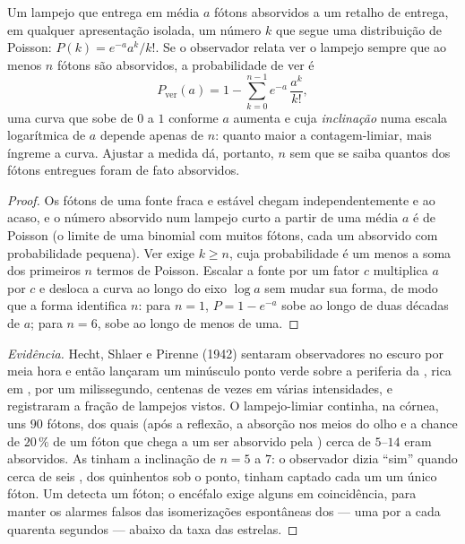 \begin{theorem}\label{thm:b3:sensory-systems:hecht}
Um lampejo que entrega em média $a$ fótons absorvidos a um retalho de
 entrega, em qualquer apresentação isolada, um número $k$ que
segue uma distribuição de Poisson: $P(k) = e^{-a}a^{k}/k!$. Se o
observador relata ver o lampejo sempre que ao menos $n$ fótons são
absorvidos, a probabilidade de ver é
\[
P_{\text{ver}}(a) = 1 - \sum_{k=0}^{n-1} e^{-a}\,\frac{a^{k}}{k!} ,
\]
uma curva que sobe de $0$ a $1$ conforme $a$ aumenta e cuja
\emph{inclinação} numa escala logarítmica de $a$ depende apenas de $n$:
quanto maior a contagem-limiar, mais íngreme a curva. Ajustar a  medida dá, portanto, $n$ sem que se saiba
quantos dos fótons entregues foram de fato absorvidos.
\end{theorem}
\begin{proof}
Os fótons de uma fonte fraca e estável chegam independentemente e ao
acaso, e o número absorvido num lampejo curto a partir de uma média $a$
é de Poisson (o limite de uma binomial com muitos fótons, cada um
absorvido com probabilidade pequena). Ver exige $k \ge n$, cuja
probabilidade é um menos a soma dos primeiros $n$ termos de Poisson.
Escalar a fonte por um fator $c$ multiplica $a$ por $c$ e desloca a
curva ao longo do eixo $\log a$ sem mudar sua forma, de modo que a forma
identifica $n$: para $n =
1$, $P = 1 - e^{-a}$ sobe ao longo de duas
décadas de $a$; para $n = 6$, sobe ao longo de menos de uma.
\end{proof}

\begin{proof}[Evidência]
Hecht, Shlaer e Pirenne (1942) sentaram observadores no escuro por meia
hora e então lançaram um minúsculo ponto verde sobre a periferia da
, rica em , por um milissegundo, centenas de vezes em
várias intensidades, e registraram a fração de lampejos vistos. O
lampejo-limiar continha, na córnea, uns $90$ fótons, dos quais (após a
reflexão, a absorção nos meios do olho e a chance de $20\,\%$ de um
fóton que chega a um  ser absorvido pela ) cerca de
$5$--$14$ eram absorvidos. As  tinham a
inclinação de $n = 5$ a $7$: o observador dizia ``sim'' quando cerca de
seis , dos quinhentos sob o ponto, tinham captado cada um um
único fóton. Um  detecta um fóton; o encéfalo exige alguns em
coincidência, para manter os alarmes falsos das isomerizações
espontâneas dos  --- uma por  a cada quarenta
segundos --- abaixo da taxa das estrelas.
\end{proof}

